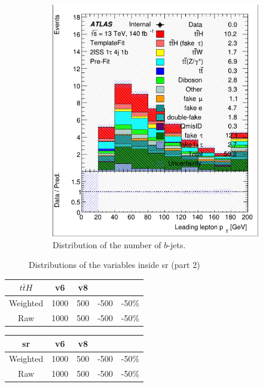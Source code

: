 \begin{figure}[htb!]
\begin{subfigure}{0.45\textwidth}
        \includegraphics[width=\linewidth]{figures/plots/histograms/nbjets.png}
        \caption{Distribution of the number of $b$-jets.}
        \label{fig:nbjets}
    \end{subfigure}
    \caption{Distributions of the variables inside \gls{sr} (part 2)}
    \label{fig:distributions2}
\end{figure}

\begin{minipage}{0.45\textwidth}
    \centering
    \begin{tabular}{c|c|c|c|c}
        $t\bar{t}H$ & \textbf{v6} & \textbf{v8} &      &       \\
        \hline
        Weighted    & 1000        & 500         & -500 & -50\% \\
        Raw         & 1000        & 500         & -500 & -50\% \\
        \hline
    \end{tabular}
    \label{tab:ttH_event_numbers1}
\end{minipage}\hfill%
\begin{minipage}{0.45\textwidth}
    \centering
    \begin{tabular}{c|c|c|c|c}
        \gls{sr} & \textbf{v6} & \textbf{v8} &      &       \\
        \hline
        Weighted & 1000        & 500         & -500 & -50\% \\
        Raw      & 1000        & 500         & -500 & -50\% \\
        \hline
    \end{tabular}
    \label{tab:ttH_event_numbers2}
\end{minipage}


